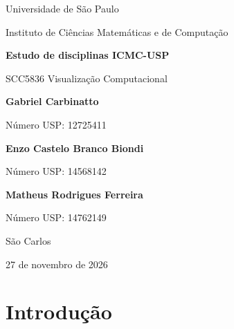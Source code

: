 \documentclass[
  12pt,
  oneside,
  a4paper,
  article,
  brazil
]{USPSC-classe/USPSC}
\begin{document}
\frenchspacing

\hypersetup{pageanchor=false}
\begin{titlingpage}
  \begin{center}
    {\large Universidade de São Paulo\par}
    \vspace{0.15cm}
    {\large Instituto de Ciências Matemáticas e de Computação\par}

    \vspace*{3.3cm}

    {\Large\bfseries Estudo de disciplinas ICMC-USP\par}

    \vspace{0.8cm}

    {\large SCC5836 Visualização Computacional\par}

    \vfill

    {\large\bfseries Gabriel Carbinatto\par}
    {\normalsize Número USP: 12725411\par}

    \vspace{0.45cm}

    {\large\bfseries Enzo Castelo Branco Biondi\par}
    {\normalsize Número USP: 14568142\par}

    \vspace{0.45cm}

    {\large\bfseries Matheus Rodrigues Ferreira\par}
    {\normalsize Número USP: 14762149\par}

    \vfill

    {\normalsize São Carlos\par}
    {\normalsize 27 de novembro de 2026\par}
  \end{center}
\end{titlingpage}
\hypersetup{pageanchor=true}
\setcounter{page}{2}

\tableofcontents*
\thispagestyle{empty}
\clearpage
\pagestyle{simple}

\section{Introdução}
\end{document}
